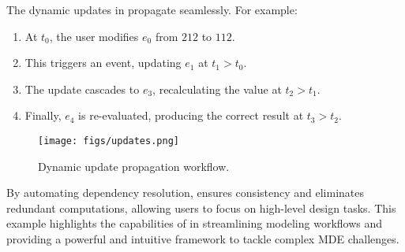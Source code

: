 The dynamic updates in \jjodel{} propagate seamlessly. For example:
\begin{enumerate}
    \item At $t_0$, the user modifies $e_0$ from $212$ to $112$.
    \item This triggers an  event, updating $e_1$ at $t_1 > t_0$.
    \item The update cascades to $e_3$, recalculating the value at $t_2 > t_1$.
    \item Finally, $e_4$ is re-evaluated, producing the correct result at $t_3 > t_2$.
\end{enumerate}

\begin{figure}[ht]
    \centering
    \texttt{[image: figs/updates.png]}
    \caption{Dynamic update propagation workflow.}
    \label{fig:updates}
\end{figure}

By automating dependency resolution, \jjodel{} ensures consistency and eliminates redundant computations, allowing users to focus on high-level design tasks. This example highlights the capabilities of \jjodel{} in streamlining modeling workflows and providing a powerful and intuitive framework to tackle complex MDE challenges.
